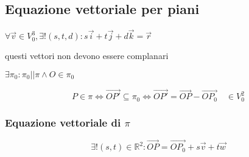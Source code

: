 \documentclass{article}
\begin{document}
\subsection*{Equazione vettoriale per piani}
\begin{flushleft}
	$\forall \overrightarrow{v} \in V^3_0, \exists ! (s,t,d):
		s\overrightarrow{i} + t\overrightarrow{j} + d\overrightarrow{k} = \overrightarrow{r}$
\end{flushleft}
\begin{flushleft}
	questi vettori non devono essere complanari
\end{flushleft}
\begin{flushleft}
	$ \exists \pi_0 :\pi_0 || \pi \land O \in  \pi_0$
\end{flushleft}
\begin{equation*}
	P\in \pi \iff \overrightarrow{OP'} \subseteq \pi_0 \iff \overrightarrow{OP'}=\overrightarrow{OP} - \overrightarrow{OP_0} \quad \in V^2_0
\end{equation*}
\subsubsection*{Equazione vettoriale di $\pi$}
\begin{equation*}
	\exists ! (s,t) \in \mathbb{R}^2:\overrightarrow{OP}=\overrightarrow{OP_0}+s\overrightarrow{v}+t\overrightarrow{w}
\end{equation*}
\end{document}
